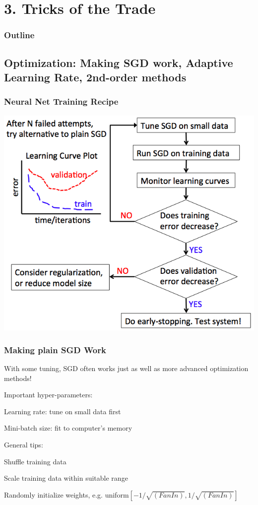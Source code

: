 \section[Tricks]{3. Tricks of the Trade}
\begin{frame}
\small{\frametitle{Outline}
\tableofcontents
}
\end{frame}


\subsection[Optimization]{Optimization: Making SGD work, Adaptive Learning Rate, 2nd-order methods}

\begin{frame}
\frametitle{Neural Net Training Recipe}
\centerline{\includegraphics[scale=0.42]{figs/training_recipe}}
\end{frame}

\begin{frame}
\frametitle{Making plain SGD Work}
\bi
\item With some tuning, SGD often works just as well as more advanced optimization methods! \pause
\item Important hyper-parameters: 
	\bi
	\item Learning rate: tune on small data first
	\item Mini-batch size: fit to computer's memory
	\ei 
	\pause
\item General tips:
	\bi
	\item Shuffle training data
	\item Scale training data within suitable range 
	\item Randomly initialize weights, e.g. uniform$[-1/\sqrt{(FanIn)}, 1/\sqrt{(FanIn)}]$
	\ei
\ei	
\end{frame}


